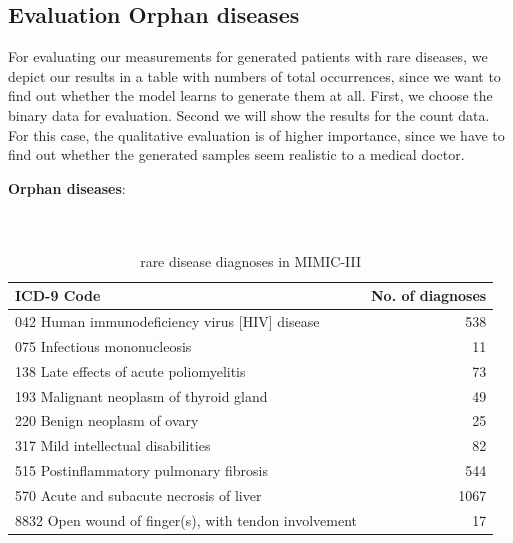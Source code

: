\documentclass[11pt, a4paper, oneside]{book}
\begin{document}
\subsection{Evaluation Orphan diseases}
For evaluating our measurements for generated patients with rare diseases, we depict our results in a table with numbers of total occurrences, since we want to find out whether the model learns to generate them at all. First, we choose the binary data for evaluation. Second we will show the results for the count data.
For this case, the qualitative evaluation is of higher importance, since we have to find out whether the generated samples seem realistic to a medical doctor.


\textbf{Orphan diseases}:
\\
\\
\\
\begin{table}
\begin{center}
\begin{tabularx}{\textwidth}{X|r}
ICD-9 Code & No. of diagnoses\\
\hline
042 Human immunodeficiency virus [HIV] disease & 538\\
075 Infectious mononucleosis & 11\\
138 Late effects of acute poliomyelitis & 73 \\
193 Malignant neoplasm of thyroid gland & 49 \\
220 Benign neoplasm of ovary & 25\\
317 Mild intellectual disabilities & 82\\
515 Postinflammatory pulmonary fibrosis & 544\\
570 Acute and subacute necrosis of liver & 1067\\
8832 Open wound of finger(s), with tendon involvement & 17\\ 
\end{tabularx}
\end{center}
\caption{\label{tab:rare-MIMIC-III}rare disease diagnoses in MIMIC-III}
\end{table}
\end{document}
